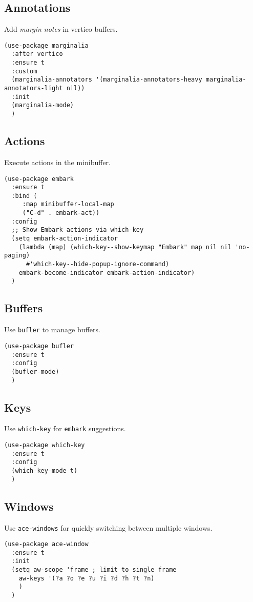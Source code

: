 \documentclass[11pt]{article}
\begin{document}
\subsection{Annotations}
\label{sec:org3bdb34e}
Add \emph{margin notes} in vertico buffers.
\begin{verbatim}
(use-package marginalia
  :after vertico
  :ensure t
  :custom
  (marginalia-annotators '(marginalia-annotators-heavy marginalia-annotators-light nil))
  :init
  (marginalia-mode)
  )
\end{verbatim}

\subsection{Actions}
\label{sec:orgbe77d71}
Execute actions in the minibuffer.
\begin{verbatim}
(use-package embark
  :ensure t
  :bind (
	 :map minibuffer-local-map
	 ("C-d" . embark-act))
  :config
  ;; Show Embark actions via which-key
  (setq embark-action-indicator
	(lambda (map) (which-key--show-keymap "Embark" map nil nil 'no-paging)
	  #'which-key--hide-popup-ignore-command)
	embark-become-indicator embark-action-indicator)
  )
\end{verbatim}
\subsection{Buffers}
\label{sec:org854b734}
Use \texttt{bufler} to manage buffers.
\begin{verbatim}
(use-package bufler
  :ensure t
  :config
  (bufler-mode)
  )
\end{verbatim}
\subsection{Keys}
\label{sec:org3c70d46}
Use \texttt{which-key} for \texttt{embark} suggestions.
\begin{verbatim}
(use-package which-key
  :ensure t
  :config
  (which-key-mode t)
  )
\end{verbatim}
\subsection{Windows}
\label{sec:org1311665}
Use \texttt{ace-windows} for quickly switching between multiple windows.
\begin{verbatim}
(use-package ace-window
  :ensure t
  :init
  (setq aw-scope 'frame ; limit to single frame
	aw-keys '(?a ?o ?e ?u ?i ?d ?h ?t ?n)
	)
  )
\end{verbatim}
\end{document}
